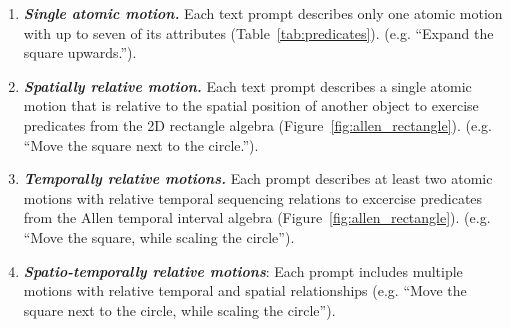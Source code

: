 \begin{enumerate}[leftmargin=0.5cm]
    \item {\bf \em Single atomic motion.}  Each text prompt describes
      only one atomic motion with up to seven of its attributes
      (Table~\ref{tab:predicates}). (e.g. ``Expand the square
      upwards.'').
    
    \item {\bf \em Spatially relative motion.}  Each text prompt
      describes a single atomic motion that is relative to the spatial
      position of another object to exercise predicates from the 2D
      rectangle algebra
      (Figure~\ref{fig:allen_rectangle}). (e.g. ``Move the square next
      to the circle.'').

    
    \item {\bf \em Temporally relative motions.}  Each prompt describes at
      least two atomic motions with relative temporal sequencing relations to
      excercise predicates from the Allen temporal interval algebra
      (Figure~\ref{fig:allen_rectangle}). (e.g. ``Move the square,
      while scaling the circle'').

    
    \item {\bf \em  Spatio-temporally relative motions}: Each prompt
      includes multiple motions with relative temporal and spatial
      relationships (e.g. ``Move the square next to the circle, while
      scaling the circle'').
\end{enumerate}



